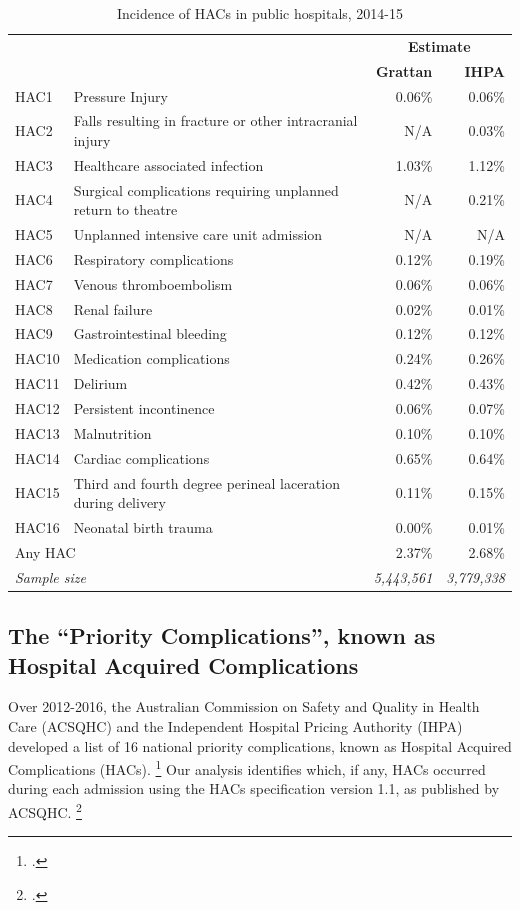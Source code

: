 \documentclass[submission]{grattan}
\begin{document}
\begin{table}
\caption{Incidence of HACs in public hospitals, 2014-15}\label{tbl:incidence-HACS-public-hospitals-2014-15}
\begin{tabularx}{\linewidth}{lXrr}
\toprule
& & \multicolumn{2}{c}{\textbf{Estimate}} \\
\cmidrule(lr){3-4}
& & \textbf{Grattan} & \textbf{IHPA}\tabularnewline
\midrule
HAC1 &Pressure Injury & 0.06\% & 0.06\%\tabularnewline
HAC2 &Falls resulting in fracture or other intracranial injury & N/A & 0.03\%\tabularnewline
HAC3 &Healthcare associated infection & 1.03\% & 1.12\%\tabularnewline
HAC4 &Surgical complications requiring unplanned return to theatre & N/A & 0.21\%\tabularnewline
HAC5 &Unplanned intensive care unit admission & N/A & N/A\tabularnewline
HAC6 &Respiratory complications & 0.12\% & 0.19\%\tabularnewline
HAC7 &Venous thromboembolism & 0.06\% & 0.06\%\tabularnewline
HAC8 &Renal failure & 0.02\% & 0.01\%\tabularnewline
HAC9 &Gastrointestinal bleeding & 0.12\% & 0.12\%\tabularnewline
HAC10& Medication complications & 0.24\% & 0.26\%\tabularnewline
HAC11& Delirium & 0.42\% & 0.43\%\tabularnewline
HAC12& Persistent incontinence & 0.06\% & 0.07\%\tabularnewline
HAC13& Malnutrition & 0.10\% & 0.10\%\tabularnewline
HAC14& Cardiac complications & 0.65\% & 0.64\%\tabularnewline
HAC15& Third and fourth degree perineal laceration during delivery & 0.11\% & 0.15\%\tabularnewline
HAC16& Neonatal birth trauma & 0.00\% & 0.01\%\tabularnewline
\multicolumn{2}{l}{Any HAC} & 2.37\% & 2.68\%\tabularnewline
\midrule
\multicolumn{2}{l}{\textit{Sample size}} & \textit{5,443,561} & \textit{3,779,338}\tabularnewline
\bottomrule
\end{tabularx}
\end{table}

\subsection{The ``Priority Complications'', known as Hospital Acquired Complications}\label{subsec:the-priority-complications-known-as-hospital-acquired-complications}

Over 2012-2016, the Australian Commission on Safety and Quality in Health Care (ACSQHC) and the Independent Hospital Pricing Authority (IHPA) developed a list of 16 national priority complications, known as Hospital Acquired Complications (HACs).%
	\footcite{ACSQHC-2017-Hospital-acquired-complications}
Our analysis identifies which, if any, HACs occurred during each admission using the HACs specification version 1.1, as published by ACSQHC.%
	\footcite{ACSQHC-2016-Hospital-acquired-complications-v1.1}
\end{document}
